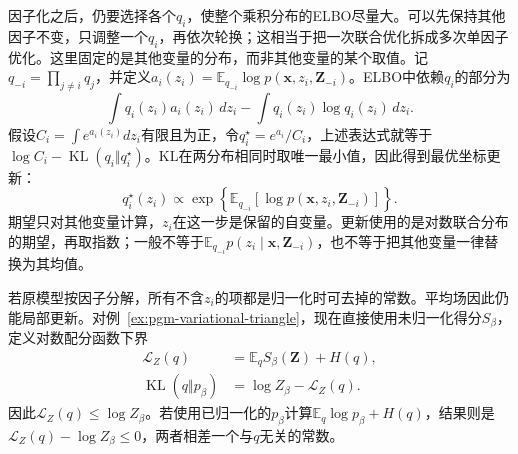 因子化之后，仍要选择各个$q_i$，使整个乘积分布的ELBO尽量大。可以先保持其他因子不变，只调整一个$q_i$，再依次轮换；这相当于把一次联合优化拆成多次单因子优化。这里固定的是其他变量的分布，而非其他变量的某个取值。记$q_{-i}=\prod_{j\ne i}q_j$，并定义$a_i(z_i)=\mathbb E_{q_{-i}}\log p(\bm{x},z_i,\bm{Z}_{-i})$。ELBO中依赖$q_i$的部分为
\[
  \int q_i(z_i)a_i(z_i)\,dz_i-\int q_i(z_i)\log q_i(z_i)\,dz_i.
\]
假设$C_i=\int e^{a_i(z_i)}dz_i$有限且为正，令$q_i^\star=e^{a_i}/C_i$，上述表达式就等于$\log C_i-\operatorname{KL}(q_i\Vert q_i^\star)$。KL在两分布相同时取唯一最小值，因此得到最优坐标更新：
\begin{equation}
  q_i^\star(z_i)
    \propto\exp\left\{\mathbb E_{q_{-i}}
      [\log p(\bm{x},z_i,\bm{Z}_{-i})]\right\}.
  \label{eq:pgm-variational-coordinate}
\end{equation}
期望只对其他变量计算，$z_i$在这一步是保留的自变量。更新使用的是对数联合分布的期望，再取指数；一般不等于$\mathbb E_{q_{-i}}p(z_i\mid\bm{x},\bm{Z}_{-i})$，也不等于把其他变量一律替换为其均值。

若原模型按因子分解，所有不含$z_i$的项都是归一化时可去掉的常数。平均场因此仍能局部更新。对例~\ref{ex:pgm-variational-triangle}，现在直接使用未归一化得分$S_\beta$，定义对数配分函数下界
\begin{equation}
  \begin{aligned}
    \mathcal L_Z(q)&=\mathbb E_qS_\beta(\bm Z)+H(q),\\
    \operatorname{KL}(q\Vert p_\beta)
      &=\log Z_\beta-\mathcal L_Z(q).
  \end{aligned}
  \label{eq:pgm-variational-partition-lower-bound}
\end{equation}
因此$\mathcal L_Z(q)\leq\log Z_\beta$。若使用已归一化的$p_\beta$计算$\mathbb E_q\log p_\beta+H(q)$，结果则是$\mathcal L_Z(q)-\log Z_\beta\leq0$，两者相差一个与$q$无关的常数。

